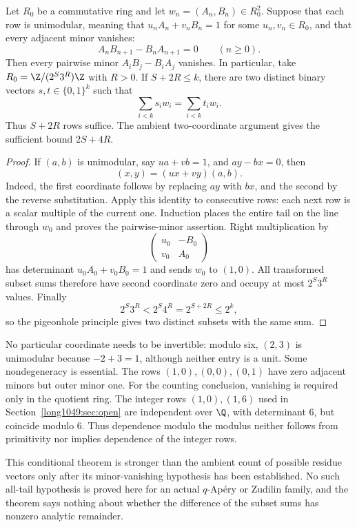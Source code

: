 \begin{theorem}
\label{long1049:res:plucker-collapse}
Let $R_0$ be a commutative ring and let $w_n=(A_n,B_n)\in R_0^2$.  Suppose
that each row is unimodular, meaning that $u_nA_n+v_nB_n=1$ for some
$u_n,v_n\in R_0$, and that every adjacent minor vanishes:
\[
 A_nB_{n+1}-B_nA_{n+1}=0\qquad(n\ge0).
\]
Then every pairwise minor $A_iB_j-B_iA_j$ vanishes.  In particular, take
$R_0=\Z/(2^S3^R)\Z$ with $R>0$.  If $S+2R\le k$, there are two distinct
binary vectors $s,t\in\{0,1\}^{k}$ such that
\[
 \sum_{i<k}s_iw_i=\sum_{i<k}t_iw_i.
\]
Thus $S+2R$ rows suffice. The ambient two-coordinate argument gives
the sufficient bound $2S+4R$.
\end{theorem}

\begin{proof}
If $(a,b)$ is unimodular, say $ua+vb=1$, and $ay-bx=0$, then
\[
 (x,y)=(ux+vy)(a,b).
\]
Indeed, the first coordinate follows by replacing $ay$ with $bx$, and the
second by the reverse substitution.  Apply this identity to consecutive rows:
each next row is a scalar multiple of the current one.  Induction places the
entire tail on the line through $w_0$ and proves the pairwise-minor assertion.
Right multiplication by
\[
 \begin{pmatrix}u_0&-B_0\\v_0&A_0\end{pmatrix}
\]
has determinant $u_0A_0+v_0B_0=1$ and sends $w_0$ to $(1,0)$.
All transformed subset sums therefore have second coordinate zero
and occupy at most $2^S3^R$ values.  Finally
\[
 2^S3^R<2^S4^R=2^{S+2R}\le2^k,
\]
so the pigeonhole principle gives two distinct subsets with the same sum.
\end{proof}

\noindent No particular coordinate needs to be invertible: modulo six,
$(2,3)$ is unimodular because $-2+3=1$, although neither entry is a unit.
Some nondegeneracy is essential. The rows $(1,0),(0,0),(0,1)$ have
zero adjacent minors but outer minor one.
For the counting conclusion, vanishing is required only in the quotient
ring. The integer rows $(1,0),(1,6)$ used in Section~\ref{long1049:sec:open}
are independent over $\Q$, with determinant $6$, but coincide modulo $6$.
Thus dependence modulo the modulus neither follows from primitivity nor
implies dependence of the integer rows.

\noindent This conditional theorem is stronger than the ambient count of possible residue vectors only
after its minor-vanishing hypothesis has been established.  No such all-tail
hypothesis is proved here for an actual $q$-Ap\'ery or Zudilin family, and the
theorem says nothing about whether the difference of the subset sums has
nonzero analytic remainder.

